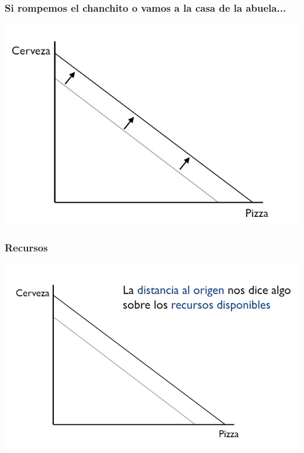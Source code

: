 \documentclass{beamer}
\begin{document}
\begin{frame}
\frametitle{Si rompemos el chanchito o vamos a la casa de la abuela...}
\centering
\includegraphics[scale=0.55]{Slides Principios de Economia/Figures/Tema_02.9_rp7.jpg}
\end{frame}

\begin{frame}
\frametitle{Recursos}
\centering
\includegraphics[scale=0.55]{Slides Principios de Economia/Figures/Tema_02.10_rp8.jpg}
\end{frame}
\end{document}
